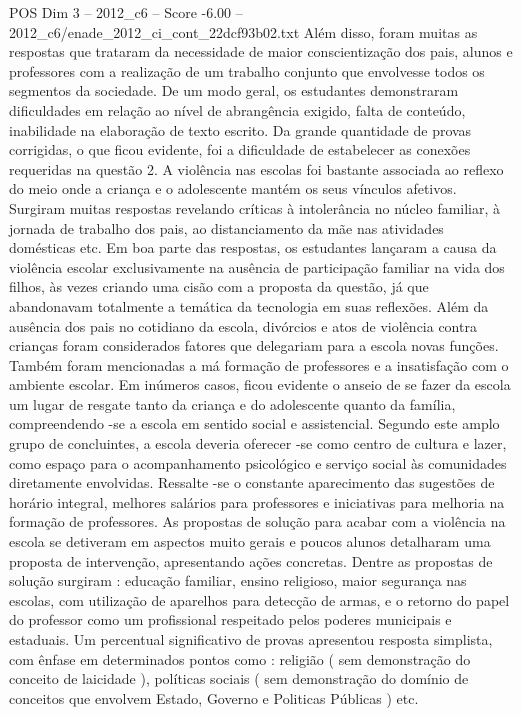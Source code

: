 \begin{textsample}{POS Dim 3 – 2012\_c6 – Score -6.00 – 2012\_c6/enade\_2012\_ci\_cont\_22dcf93b02.txt}
Além disso, foram muitas as respostas que trataram da necessidade de maior conscientização dos pais, alunos e professores com a realização de um trabalho conjunto que envolvesse todos os segmentos da sociedade.
De um modo geral, os estudantes demonstraram dificuldades em relação ao nível de abrangência exigido, falta de conteúdo, inabilidade na elaboração de texto escrito.
Da grande quantidade de provas corrigidas, o que ficou evidente, foi a dificuldade de estabelecer as conexões requeridas na questão 2.
A violência nas escolas foi bastante associada ao reflexo do meio onde a criança e o adolescente mantém os seus vínculos afetivos.
Surgiram muitas respostas revelando críticas à intolerância no núcleo familiar, à jornada de trabalho dos pais, ao distanciamento da mãe nas atividades domésticas etc.
Em boa parte das respostas, os estudantes lançaram a causa da violência escolar exclusivamente na ausência de participação familiar na vida dos filhos, às vezes criando uma cisão com a proposta da questão, já que abandonavam totalmente a temática da tecnologia em suas reflexões.
Além da ausência dos pais no cotidiano da escola, divórcios e atos de violência contra crianças foram considerados fatores que delegariam para a escola novas funções.
Também foram mencionadas a má formação de professores e a insatisfação com o ambiente escolar.
Em inúmeros casos, ficou evidente o anseio de se fazer da escola um lugar de resgate tanto da criança e do adolescente quanto da família, compreendendo -se a escola em sentido social e assistencial.
Segundo este amplo grupo de concluintes, a escola deveria oferecer -se como centro de cultura e lazer, como espaço para o acompanhamento psicológico e serviço social às comunidades diretamente envolvidas.
Ressalte -se o constante aparecimento das sugestões de horário integral, melhores salários para professores e iniciativas para melhoria na formação de professores.
As propostas de solução para acabar com a violência na escola se detiveram em aspectos muito gerais e poucos alunos detalharam uma proposta de intervenção, apresentando ações concretas.
Dentre as propostas de solução surgiram : educação familiar, ensino religioso, maior segurança nas escolas, com utilização de aparelhos para detecção de armas, e o retorno do papel do professor como um profissional respeitado pelos poderes municipais e estaduais.
Um percentual significativo de provas apresentou resposta simplista, com ênfase em determinados pontos como : religião ( sem demonstração do conceito de laicidade ), políticas sociais ( sem demonstração do domínio de conceitos que envolvem Estado, Governo e Politicas Públicas ) etc.

\end{textsample}
